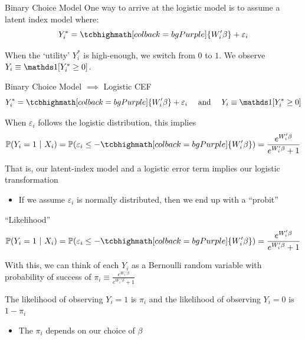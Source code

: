 \documentclass[aspectratio=169,t,11pt,table]{beamer}
\begin{document}

\begin{frame}{Binary Choice Model}
  One way to arrive at the logistic model is to assume a \alert{latent index model} where:
  $$
    Y_{i}^* = \tcbhighmath[colback = bgPurple]{W_i' \beta} + \varepsilon_i
  $$

  \bigskip
  When the `utility' $Y_i^*$ is high-enough, we switch from $0$ to $1$. 
  We observe $Y_i \equiv \one{Y_i^* \geq 0}$.
\end{frame}

\begin{frame}{Binary Choice Model $\implies$ Logistic CEF}
  \vspace*{-\bigskipamount}
  $$
    Y_{i}^* = \tcbhighmath[colback = bgPurple]{W_i' \beta} + \varepsilon_i 
    \quad \text{ and } \quad 
    Y_i \equiv \one{Y_i^* \geq 0}
  $$

  \bigskip
  When $\varepsilon_i$ follows the \alert{logistic distribution}, this implies 
  $$
    \prob{Y_i = 1}{X_i} = 
    \prob{\varepsilon_i \leq - \tcbhighmath[colback = bgPurple]{W_i' \beta}} = 
    \frac{e^{W_i'\beta}}{e^{W_i'\beta} + 1}
  $$

  \pause
  \bigskip
  \bigskip
  That is, our latent-index model and a logistic error term implies our logistic transformation
  \begin{itemize}
    \item If we assume $\varepsilon_i$ is normally distributed, then we end up with a ``probit''
  \end{itemize}
\end{frame}

\begin{frame}{``Likelihood''}
  \vspace*{-\bigskipamount}
  $$
    \prob{Y_i = 1}{X_i} = 
    \prob{\varepsilon_i \leq - \tcbhighmath[colback = bgPurple]{W_i' \beta}} = 
    \frac{e^{W_i'\beta}}{e^{W_i'\beta} + 1}
  $$

  \bigskip
  With this, we can think of each $Y_i$ as a Bernoulli random variable with probability of success of $\pi_i \equiv \frac{e^{W_i'\beta}}{e^{W_i'\beta} + 1}$

  \pause
  \bigskip
  \bigskip
  The \alert{likelihood} of observing $Y_i = 1$ is $\pi_i$ and the \alert{likelihood} of observing $Y_i = 0$ is $1 - \pi_i$
  \begin{itemize}
    \item The $\pi_i$ depends on our choice of $\beta$
  \end{itemize}
\end{frame}
\end{document}
